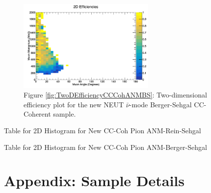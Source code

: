 \documentclass[11pt]{article}
\begin{document}
\begin{figure}[H]
\centering
\includegraphics[width=0.6\textwidth]{CCCohPlots/2DEffANMBS.png}
\caption*{Figure \ref*{fig:TwoDEfficiencyCCCohANMBS}: Two-dimensional efficiency plot for the new NEUT $\bar{\nu}$-mode Berger-Sehgal CC-Coherent sample.}
\end{figure}\label{fig:TwoDEfficiencyCCCohANMBS}



\newpage
\begin{landscape}
\begin{table}
\centering
\caption{Table for 2D Histogram for New CC-Coh Pion ANM-Rein-Sehgal}
\begin{adjustbox}{width=\paperwidth}
\end{adjustbox}
\end{table}
\end{landscape}

\newpage
\begin{landscape}
\begin{table}
\centering
\caption{Table for 2D Histogram for New CC-Coh Pion ANM-Berger-Sehgal}
\begin{adjustbox}{width=\paperwidth}
\end{adjustbox}
\end{table}
\end{landscape}


%
\newpage

\appendix


\section{Appendix: Sample Details}\label{sec:SampleAppendix}
\end{document}
